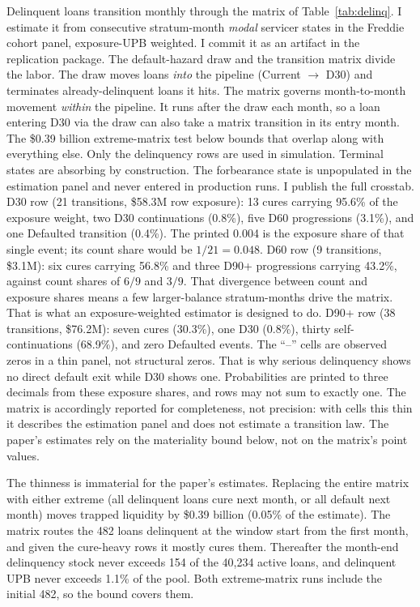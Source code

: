 \documentclass[12pt]{article}
\begin{document}
Delinquent loans transition monthly through the matrix of Table~\ref{tab:delinq}. I estimate it from consecutive stratum-month \emph{modal} servicer states in the Freddie cohort panel, exposure-UPB weighted. I commit it as an artifact in the replication package. The default-hazard draw and the transition matrix divide the labor. The draw moves loans \emph{into} the pipeline (Current $\to$ D30) and terminates already-delinquent loans it hits. The matrix governs month-to-month movement \emph{within} the pipeline. It runs after the draw each month, so a loan entering D30 via the draw can also take a matrix transition in its entry month. The \$0.39 billion extreme-matrix test below bounds that overlap along with everything else. Only the delinquency rows are used in simulation. Terminal states are absorbing by construction. The forbearance state is unpopulated in the estimation panel and never entered in production runs.
I publish the full crosstab. D30 row (21 transitions, \$58.3M row exposure): 13 cures carrying 95.6\% of the exposure weight, two D30 continuations (0.8\%), five D60 progressions (3.1\%), and one Defaulted transition (0.4\%). The printed 0.004 is the exposure share of that single event; its count share would be $1/21 = 0.048$. D60 row (9 transitions, \$3.1M): six cures carrying 56.8\% and three D90+ progressions carrying 43.2\%, against count shares of $6/9$ and $3/9$. That divergence between count and exposure shares means a few larger-balance stratum-months drive the matrix. That is what an exposure-weighted estimator is designed to do. D90+ row (38 transitions, \$76.2M): seven cures (30.3\%), one D30 (0.8\%), thirty self-continuations (68.9\%), and zero Defaulted events. The ``--'' cells are observed zeros in a thin panel, not structural zeros. That is why serious delinquency shows no direct default exit while D30 shows one. Probabilities are printed to three decimals from these exposure shares, and rows may not sum to exactly one. The matrix is accordingly reported for completeness, not precision: with cells this thin it describes the estimation panel and does not estimate a transition law. The paper's estimates rely on the materiality bound below, not on the matrix's point values.

The thinness is immaterial for the paper's estimates. Replacing the entire matrix with either extreme (all delinquent loans cure next month, or all default next month) moves trapped liquidity by \$0.39 billion (0.05\% of the estimate). The matrix routes the 482 loans delinquent at the window start from the first month, and given the cure-heavy rows it mostly cures them. Thereafter the month-end delinquency stock never exceeds 154 of the 40,234 active loans, and delinquent UPB never exceeds 1.1\% of the pool. Both extreme-matrix runs include the initial 482, so the bound covers them.
\end{document}
